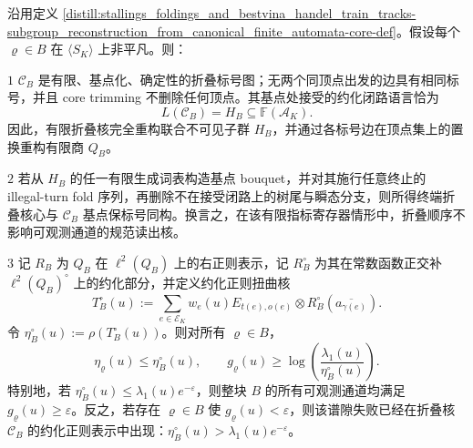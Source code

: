 \begin{theorem}[可观测通道的折叠核重构与约化正则谱包络]\label{distill:stallings_foldings_and_bestvina_handel_train_tracks-subgroup_reconstruction_from_canonical_finite_automata-core}
沿用定义 \ref{distill:stallings_foldings_and_bestvina_handel_train_tracks-subgroup_reconstruction_from_canonical_finite_automata-core-def}。假设每个 \(\varrho\in B\) 在 \(\langle S_K\rangle\) 上非平凡。则：

\(1\) \(\mathscr C_B\) 是有限、基点化、确定性的折叠标号图；无两个同顶点出发的边具有相同标号，并且 core trimming 不删除任何顶点。其基点处接受的约化闭路语言恰为
\[
L(\mathscr C_B)=H_B\subseteq \mathbb F(\mathcal A_K).
\]
因此，有限折叠核完全重构联合不可见子群 \(H_B\)，并通过各标号边在顶点集上的置换重构有限商 \(Q_B\)。

\(2\) 若从 \(H_B\) 的任一有限生成词表构造基点 bouquet，并对其施行任意终止的 illegal-turn fold 序列，再删除不在接受闭路上的树尾与瞬态分支，则所得终端折叠核心与 \(\mathscr C_B\) 基点保标号同构。换言之，在该有限指标寄存器情形中，折叠顺序不影响可观测通道的规范读出核。

\(3\) 记 \(R_B\) 为 \(Q_B\) 在 \(\ell^2(Q_B)\) 上的右正则表示，记 \(R_B^\circ\) 为其在常数函数正交补 \(\ell^2(Q_B)^\circ\) 上的约化部分，并定义约化正则扭曲核
\[
T_B^\circ(u):=\sum_{e\in\mathcal E_K}w_e(u)E_{t(e),o(e)}\otimes R_B^\circ(\overline{a_{\gamma(e)}}).
\]
令 \(\eta_B^\circ(u):=\rho(T_B^\circ(u))\)。则对所有 \(\varrho\in B\)，
\[
\eta_{\varrho}(u)\leq \eta_B^\circ(u),
\qquad
g_{\varrho}(u)\geq \log\!\left(\frac{\lambda_1(u)}{\eta_B^\circ(u)}\right).
\]
特别地，若 \(\eta_B^\circ(u)\leq \lambda_1(u)e^{-\varepsilon}\)，则整块 \(B\) 的所有可观测通道均满足 \(g_{\varrho}(u)\geq\varepsilon\)。反之，若存在 \(\varrho\in B\) 使 \(g_{\varrho}(u)<\varepsilon\)，则该谱隙失败已经在折叠核 \(\mathscr C_B\) 的约化正则表示中出现：\(\eta_B^\circ(u)>\lambda_1(u)e^{-\varepsilon}\)。
\end{theorem}

